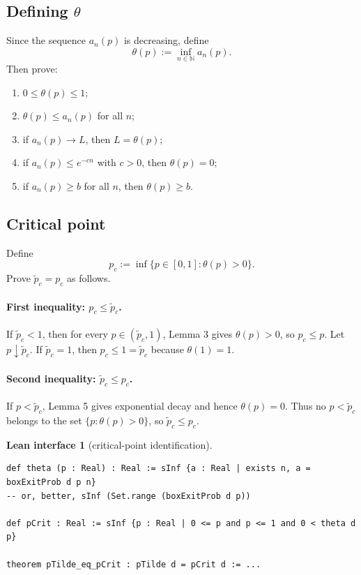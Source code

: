 \documentclass[11pt]{article}
\newcommand{\N}{\mathbb N}
\newcommand{\pcrit}{p_c}
\newcommand{\ptilde}{\widetilde p_c}
\theoremstyle{definition}
\newtheorem{interface}[definition]{Lean interface}
\theoremstyle{plain}
\begin{document}
\subsection{Defining $\theta$}

Since the sequence $a_n(p)$ is decreasing, define
\[
  \theta(p):=\inf_{n\in\N}a_n(p).
\]
Then prove:
\begin{enumerate}[leftmargin=1.4em]
  \item $0\le\theta(p)\le1$;
  \item $\theta(p)\le a_n(p)$ for all $n$;
  \item if $a_n(p)\to L$, then $L=\theta(p)$;
  \item if $a_n(p)\le e^{-cn}$ with $c>0$, then $\theta(p)=0$;
  \item if $a_n(p)\ge b$ for all $n$, then $\theta(p)\ge b$.
\end{enumerate}

\subsection{Critical point}

Define
\[
  \pcrit:=\inf\{p\in[0,1]:\theta(p)>0\}.
\]
Prove $\ptilde=\pcrit$ as follows.

\paragraph{First inequality: $\pcrit\le\ptilde$.}
If $\ptilde<1$, then for every $p\in(\ptilde,1)$, Lemma 3 gives $\theta(p)>0$, so $\pcrit\le p$.  Let $p\downarrow\ptilde$.  If $\ptilde=1$, then $\pcrit\le1=\ptilde$ because $\theta(1)=1$.

\paragraph{Second inequality: $\ptilde\le\pcrit$.}
If $p<\ptilde$, Lemma 5 gives exponential decay and hence $\theta(p)=0$.  Thus no $p<\ptilde$ belongs to the set $\{p:\theta(p)>0\}$, so $\ptilde\le\pcrit$.

\begin{interface}[critical-point identification]
\begin{lstlisting}
def theta (p : Real) : Real := sInf {a : Real | exists n, a = boxExitProb d p n}
-- or, better, sInf (Set.range (boxExitProb d p))

def pCrit : Real := sInf {p : Real | 0 <= p and p <= 1 and 0 < theta d p}

theorem pTilde_eq_pCrit : pTilde d = pCrit d := ...
\end{lstlisting}
\end{interface}
\end{document}
